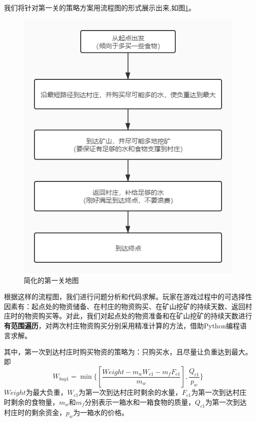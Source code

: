 \documentclass[withoutpre]{cumcmthesis} %
\begin{document}
我们将针对第一关的策略方案用流程图的形式展示出来,如图\ref{fig:map1lc}。
\begin{figure}[h]
	\centering
	\includegraphics[scale=0.4]{figures/map1liuchengtu}
	\caption{简化的第一关地图}
	\label{fig:map1lc}
\end{figure}
根据这样的流程图，我们进行问题分析和代码求解。玩家在游戏过程中的可选择性因素有：起点处的物资储备、在村庄的物资购买、在矿山挖矿的持续天数、返回村庄时的物资购买等。对此，我们对起点处的物资准备和在矿山挖矿的持续天数进行\textbf{有范围遍历}，对两次村庄物资购买分别采用精准计算的方法，借助Python编程语言求解。

其中，第一次到达村庄时购买物资的策略为：只购买水，且尽量让负重达到最大。即
\begin{equation}
	W_{buy1}=\min\{[\displaystyle \frac{Weight-m_wW_{c1}-m_fF_{c1}}{m_w}],\frac{Q_{c1}}{p_w}\}
\end{equation}
$Weight$为最大负重，$W_{c1}$为第一次到达村庄时剩余的水量，$F_{c1}$为第一次到达村庄时剩余的食物量，$m_w$和$m_f$分别表示一箱水和一箱食物的质量，$Q_{c1}$为第一次到达村庄时的剩余资金，$p_w$为一箱水的价格。\\
\end{document}
